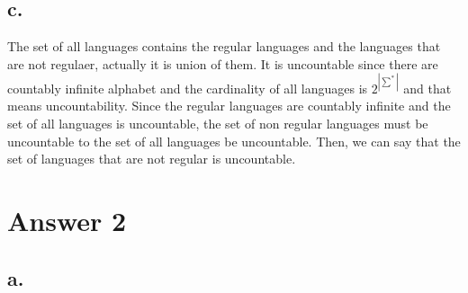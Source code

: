 \documentclass[12pt]{article}
\begin{document}
\subsection*{c.}
The set of all languages contains the regular languages and the languages that are not regulaer, actually it is union of them. It is uncountable since there are countably infinite alphabet and the cardinality of all languages is $2^{|\sum^*|}$ and that means uncountability. Since the regular languages are countably infinite and the set of all languages is uncountable, the set of non regular languages must be uncountable to the set of all languages be uncountable. Then, we can say that the set of languages that are not regular is uncountable.



\section*{Answer 2}
\subsection*{a.}
\end{document}
